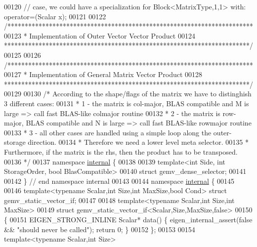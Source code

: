 \begin{DoxyCode}
00120 \textcolor{comment}{// case, we could have a specialization for Block<MatrixType,1,1> with: operator=(Scalar x);}
00121 
00122 \textcolor{comment}{/***********************************************************************}
00123 \textcolor{comment}{*  Implementation of Outer Vector Vector Product}
00124 \textcolor{comment}{***********************************************************************/}
00125 
00126 \textcolor{comment}{/***********************************************************************}
00127 \textcolor{comment}{*  Implementation of General Matrix Vector Product}
00128 \textcolor{comment}{***********************************************************************/}
00129 
00130 \textcolor{comment}{/*  According to the shape/flags of the matrix we have to distinghish 3 different cases:}
00131 \textcolor{comment}{ *   1 - the matrix is col-major, BLAS compatible and M is large => call fast BLAS-like colmajor routine}
00132 \textcolor{comment}{ *   2 - the matrix is row-major, BLAS compatible and N is large => call fast BLAS-like rowmajor routine}
00133 \textcolor{comment}{ *   3 - all other cases are handled using a simple loop along the outer-storage direction.}
00134 \textcolor{comment}{ *  Therefore we need a lower level meta selector.}
00135 \textcolor{comment}{ *  Furthermore, if the matrix is the rhs, then the product has to be transposed.}
00136 \textcolor{comment}{ */}
00137 \textcolor{keyword}{namespace }\hyperlink{namespaceinternal}{internal} \{
00138 
00139 \textcolor{keyword}{template}<\textcolor{keywordtype}{int} S\textcolor{keywordtype}{id}e, \textcolor{keywordtype}{int} StorageOrder, \textcolor{keywordtype}{bool} BlasCompatible>
00140 \textcolor{keyword}{struct }gemv\_dense\_selector;
00141 
00142 \} \textcolor{comment}{// end namespace internal}
00143 
00144 \textcolor{keyword}{namespace }\hyperlink{namespaceinternal}{internal} \{
00145 
00146 \textcolor{keyword}{template}<\textcolor{keyword}{typename} Scalar,\textcolor{keywordtype}{int} Size,\textcolor{keywordtype}{int} MaxSize,\textcolor{keywordtype}{bool} Cond> \textcolor{keyword}{struct }gemv\_static\_vector\_if;
00147 
00148 \textcolor{keyword}{template}<\textcolor{keyword}{typename} Scalar,\textcolor{keywordtype}{int} Size,\textcolor{keywordtype}{int} MaxSize>
00149 \textcolor{keyword}{struct }gemv\_static\_vector\_if<Scalar,Size,MaxSize,false>
00150 \{
00151   EIGEN\_STRONG\_INLINE  Scalar* data() \{ eigen\_internal\_assert(\textcolor{keyword}{false} && \textcolor{stringliteral}{"should never be called"}); \textcolor{keywordflow}{return} 0;
       \}
00152 \};
00153 
00154 \textcolor{keyword}{template}<\textcolor{keyword}{typename} Scalar,\textcolor{keywordtype}{int} Size>

\end{DoxyCode}

